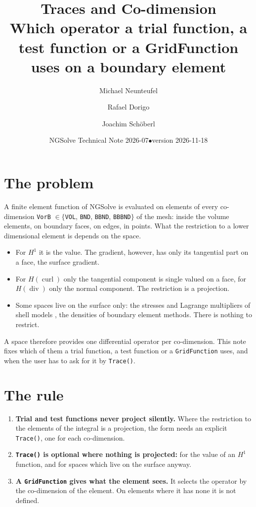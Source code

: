 \documentclass[10pt,a4paper]{article}
\title{\vspace{-1.2cm}Traces and Co-dimension\\[2pt]
\large Which operator a trial function, a test function or a GridFunction uses on a boundary element}
\author{Michael Neunteufel \and Rafael Dorigo \and Joachim Sch\"oberl}
\date{NGSolve Technical Note 2026-07\quad$\bullet$\quad version 2026-11-18}
\newcommand{\code}[1]{\texttt{#1}}
\begin{document}
\maketitle\vspace{-1.2cm}

\section{The problem}

A finite element function of NGSolve \cite{s14} is evaluated on elements of every co-dimension \code{VorB} $\in\{$\code{VOL}, \code{BND}, \code{BBND}, \code{BBBND}$\}$ of the mesh: inside the volume elements, on boundary faces, on edges, in points. What the restriction to a lower dimensional element is depends on the space.
\begin{itemize}\setlength\itemsep{1pt}
\item For $H^1$ it is the value. The gradient, however, has only its tangential part on a face, the surface gradient.
\item For $H(\operatorname{curl})$ only the tangential component is single valued on a face, for $H(\operatorname{div})$ only the normal component. The restriction is a projection.
\item Some spaces live on the surface only: the stresses and Lagrange multipliers of shell models \cite{ns19,ns21}, the densities of boundary element methods. There is nothing to restrict.
\end{itemize}
A space therefore provides one differential operator per co-dimension. This note fixes which of them a trial function, a test function or a \code{GridFunction} uses, and when the user has to ask for it by \code{Trace()}.

\section{The rule}

\begin{enumerate}\setlength\itemsep{1pt}
\item \textbf{Trial and test functions never project silently.} Where the restriction to the elements of the integral is a projection, the form needs an explicit \code{Trace()}, one for each co-dimension.
\item \textbf{\code{Trace()} is optional where nothing is projected:} for the value of an $H^1$ function, and for spaces which live on the surface anyway.
\item \textbf{A \code{GridFunction} gives what the element sees.} It selects the operator by the co-dimension of the element. On elements where it has none it is not defined.
\end{enumerate}
\end{document}
